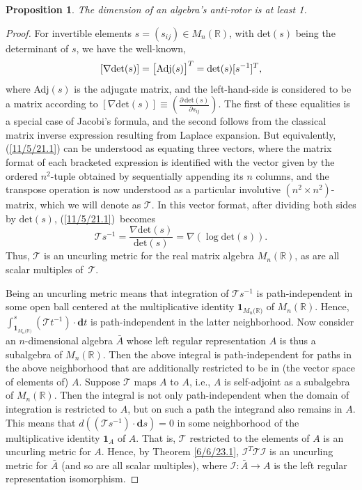 \documentclass{amsart}
\newtheorem{proposition}[theorem]{Proposition}
\theoremstyle{definition}
\numberwithin{theorem}{section}
\numberwithin{equation}{section}
\begin{document}
\begin{proposition}\label{6/11/25.1} The dimension of an algebra's anti-rotor is at least 1. \end{proposition} 
\begin{proof} For invertible elements $s = (s_{ij})\in M_n(\mathbb{R})$, with det$(s)$ being the determinant of $s$, we have the well-known,
  \begin{equation}\label{11/5/21.1}[\nabla \text{det}(s)] = \big[{\rm Adj}(s)\big]^T = \mbox{det}(s)[s^{-1}]^T,\end{equation} where Adj$(s)$ is the adjugate matrix, and the left-hand-side is considered to be a matrix according to $[\nabla \text{det}(s)]\equiv \left(\frac{\partial\,\text{det}(s)}{\partial s_{ij}}\right)$. The first of these equalities is a special case of Jacobi's formula, and the second follows from the classical matrix inverse expression resulting from Laplace expansion. 
    But equivalently, (\ref{11/5/21.1}) can be understood as equating three vectors, where the matrix format of each bracketed expression is identified with the vector given by the ordered \mbox{$n^2$-tuple} obtained by sequentially appending its $n$ columns, and the transpose operation is now understood as a particular involutive $(n^2\times n^2)$-matrix, which we will denote as $\mathcal{T}$.  In this vector format, after dividing both sides by $\text{det}(s)$, \mbox{(\ref{11/5/21.1}) becomes} \begin{equation}\label{6/11/25.2}\mathcal{T}s^{-1} = \frac{\nabla\text{det}(s)}{\text{det}(s)} = \nabla\left(\log \text{det}(s)\right).\end{equation}  Thus,  $\mathcal{T}$ is an uncurling metric for the real matrix algebra $M_n(\mathbb{R})$, as are all scalar multiples \mbox{of $\mathcal{T}$}. 
    

Being an uncurling metric means that integration of $\mathcal{T}s^{-1}$ is path-independent in some open ball centered at the multiplicative identity $\mathbf{1}_{M_n({\mathbb{R})}}$ of $M_n(\mathbb{R})$.  
 Hence, \mbox{$\int_{\mathbf{1}_{M_n({\mathbb{R})}}}^s (\mathcal{\mathcal{T}}t^{-1})\cdot \mathbf{d}t$} is path-independent in the latter neighborhood.  Now consider an $n$-dimensional algebra $\bar{A}$ whose left regular representation $A$ is thus a subalgebra of $M_n(\mathbb{R})$.  Then the above integral is path-independent for paths in the above neighborhood that are additionally restricted to be in (the vector space of elements of) $A$.  Suppose $\mathcal{T}$ maps $A$ to $A$, i.e., $A$ is self-adjoint as a subalgebra of $M_n(\mathbb{R})$. 
 Then the integral is not only path-independent when the domain of integration is restricted to $A$, but on such a path the integrand also remains in $A$.  This means that 
  $d((\mathcal{T}s^{-1})\cdot \mathbf{d}s) = 0$ in some neighborhood of the multiplicative identity $\mathbf{1}_A$ of $A$.  That is,  $\mathcal{T}$ restricted to the elements of $A$ is an uncurling metric for $A$.  Hence, by Theorem \ref{6/6/23.1}, $\mathcal{I}^T\mathcal{T}\mathcal{I}$ is an uncurling metric for $\bar{A}$ (and so are all scalar multiples), where $\mathcal{I}:\bar{A}\rightarrow A$ is the left regular representation isomorphism.  
  

\end{proof}
\end{document}
